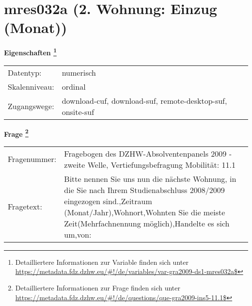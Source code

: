 
    \setcounter{footnote}{0}

    \vspace*{-1.8cm}
	\section{mres032a (2. Wohnung: Einzug (Monat))}
	\label{section:mres032a}



    \vspace*{0.5cm}
    \noindent\textbf{Eigenschaften
	\footnote{Detailliertere Informationen zur Variable finden sich unter
		\url{https://metadata.fdz.dzhw.eu/\#!/de/variables/var-gra2009-ds1-mres032a$}}}\\
	\begin{tabularx}{\hsize}{@{}lX}
	Datentyp: & numerisch \\
	Skalenniveau: & ordinal \\
	Zugangswege: &
	  download-cuf, 
	  download-suf, 
	  remote-desktop-suf, 
	  onsite-suf
 \\
    \end{tabularx}



				\vspace*{0.5cm}
                \noindent\textbf{Frage
	                \footnote{Detailliertere Informationen zur Frage finden sich unter
		              \url{https://metadata.fdz.dzhw.eu/\#!/de/questions/que-gra2009-ins5-11.1$}}}\\
				\begin{tabularx}{\hsize}{@{}lX}
					Fragenummer: &
					  Fragebogen des DZHW-Absolventenpanels 2009 - zweite Welle, Vertiefungsbefragung Mobilität:
					  11.1
 \\
					Fragetext: & Bitte nennen Sie uns nun die nächste Wohnung, in die Sie nach Ihrem Studienabschluss 2008/2009 eingezogen sind.,Zeitraum (Monat/Jahr),Wohnort,Wohnten Sie die meiste Zeit(Mehrfachnennung möglich),Handelte es sich um,von: \\
				\end{tabularx}





